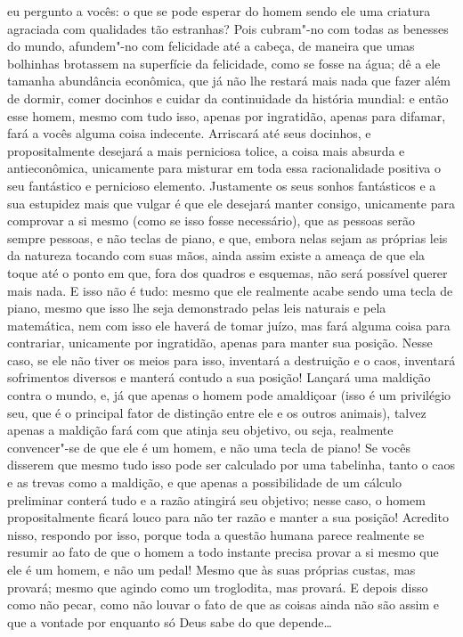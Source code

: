 eu pergunto a vocês: o que se pode esperar do homem sendo ele uma criatura
agraciada com qualidades tão estranhas? Pois cubram"-no com todas as benesses do
mundo, afundem"-no com felicidade até a cabeça, de maneira que umas bolhinhas
brotassem na superfície da felicidade, como se fosse na água; dê a ele tamanha
abundância econômica, que já não lhe restará mais nada que fazer além de
dormir, comer docinhos e cuidar da continuidade da história mundial: e então
esse homem, mesmo com tudo isso, apenas por ingratidão, apenas para difamar,
fará a vocês alguma coisa indecente. Arriscará até seus docinhos, e
propositalmente desejará a mais perniciosa tolice, a coisa mais absurda e
antieconômica, unicamente para misturar em toda essa racionalidade positiva o
seu fantástico e pernicioso elemento.  Justamente os seus sonhos fantásticos e
a sua estupidez mais que vulgar é que ele desejará manter consigo, unicamente
para comprovar a si mesmo (como se isso fosse necessário), que as pessoas serão
sempre pessoas, e não teclas de piano, e que, embora nelas sejam as próprias
leis da natureza tocando com suas mãos, ainda assim existe a ameaça de que ela
toque até o ponto em que, fora dos quadros e esquemas, não será possível querer
mais nada. E isso não é tudo: mesmo que ele realmente acabe sendo uma tecla de
piano, mesmo que isso lhe seja demonstrado pelas leis naturais e pela
matemática, nem com isso ele haverá de tomar juízo, mas fará alguma coisa
para contrariar, unicamente por ingratidão, apenas para manter sua posição.
Nesse caso, se ele não tiver os meios para isso, inventará a destruição e o
caos, inventará sofrimentos diversos e manterá contudo a sua posição! Lançará
uma maldição contra o mundo, e, já que apenas o homem pode amaldiçoar (isso é
um privilégio seu, que é o principal fator de distinção entre ele e os outros
animais), talvez apenas a maldição fará com que atinja seu objetivo, ou seja,
realmente convencer"-se de que ele é um homem, e não uma tecla de piano! Se
vocês disserem que mesmo tudo isso pode ser calculado por uma tabelinha, tanto
o caos e as trevas como a maldição, e que apenas a possibilidade de um cálculo
preliminar conterá tudo e a razão atingirá seu objetivo; nesse caso, o homem
propositalmente ficará louco para não ter razão e manter a sua posição!
Acredito nisso, respondo por isso, porque toda a questão humana parece
realmente se resumir ao fato de que o homem a todo instante precisa provar a si
mesmo que ele é um homem, e não um pedal! Mesmo que às suas próprias custas,
mas provará; mesmo que agindo como um troglodita, mas provará.  E depois disso
como não pecar, como não louvar o fato de que as coisas ainda não são assim e
que a vontade por enquanto só Deus sabe do que depende\ldots{}

